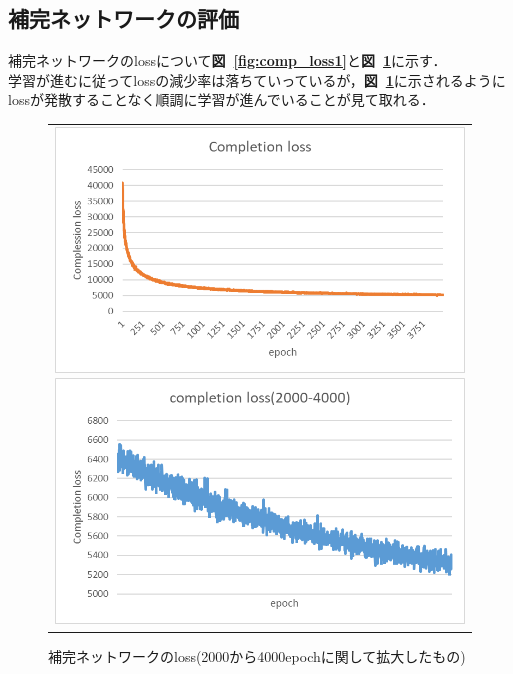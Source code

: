 \documentclass[a4j, 11pt]{jreport}
\newcommand{\figref}[1]{\textbf{図~\ref{#1}}}
\begin{document}
\subsection{補完ネットワークの評価}
補完ネットワークのlossについて\figref{fig:comp_loss1}と\figref{fig:comp_loss2}に示す．\\
学習が進むに従ってlossの減少率は落ちていっているが，\figref{fig:comp_loss2}に示されるようにlossが発散することなく順調に学習が進んでいることが見て取れる．
\begin{figure}[H]
	\centering
	  \begin{tabular}{c}
		\begin{minipage}{0.50\hsize}
		  \centering
			\includegraphics[scale=0.5]
			{images/result/loss/completion_loss1(2).png}
			\caption{補完ネットワークのloss}
			\label{fig:comp_loss1}
		\end{minipage}
   
   
		\begin{minipage}{0.50\hsize}
		  \centering
			\includegraphics[scale=0.5]
							{images/result/loss/completion_loss2(2).png}
							\caption{補完ネットワークのloss(2000から4000epochに関して拡大したもの)}
							\label{fig:comp_loss2}
		\end{minipage} \\
	\end{tabular}
\end{figure}  
\end{document}
